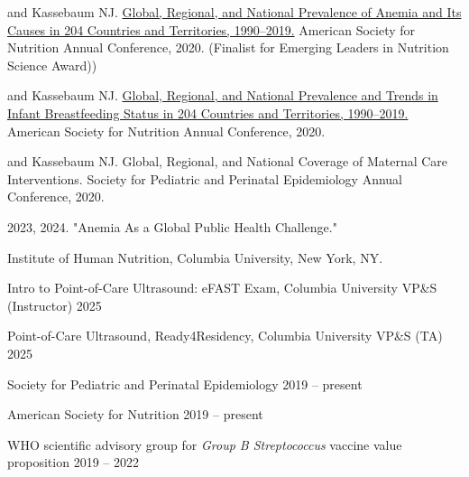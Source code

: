 \documentclass[11pt,article,oneside]{memoir}
\begin{document}
 and Kassebaum NJ. \href{https://doi.org/10.1093/cdn/nzaa053_035}{Global, Regional, and National Prevalence of Anemia and Its
Causes in 204 Countries and Territories, 1990--2019.} American Society for Nutrition Annual Conference, 2020. (Finalist for Emerging 
Leaders in Nutrition Science Award))

 and Kassebaum NJ. \href{https://doi.org/10.1093/cdn/nzaa054_064}{Global, Regional, and National Prevalence and Trends in Infant Breastfeeding Status in 204 Countries and Territories, 1990--2019.} 
American Society for Nutrition Annual Conference, 2020.

 and Kassebaum NJ. Global, Regional, and National Coverage of Maternal Care
Interventions. Society for Pediatric and Perinatal Epidemiology Annual Conference, 2020. 

\bigskip 

\medskip

 2023, 2024. "Anemia As a Global Public Health Challenge." 

\indent \indent Institute of Human Nutrition, Columbia University, New York, NY.

\bigskip 

\medskip

\ind Intro to Point-of-Care Ultrasound: eFAST Exam, Columbia University VP\&S (Instructor) \hfill 2025 

\ind Point-of-Care Ultrasound, Ready4Residency, Columbia University VP\&S (TA) \hfill 2025

\bigskip

\medskip

\ind Society for Pediatric and Perinatal Epidemiology \hfill 2019 -- present

\ind American Society for Nutrition \hfill 2019 -- present

\ind WHO scientific advisory group for \emph{Group B Streptococcus} vaccine value proposition \hfill 2019 -- 2022

\bigskip


\medskip
\end{document}
